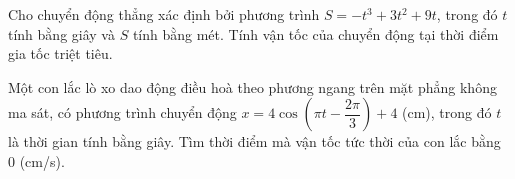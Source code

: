\begin{ex}%
	Cho chuyển động thẳng xác định bởi phương trình $S=-t^3+3 t^2+9 t$,  trong đó $t$ tính bằng giây và $S$ tính bằng mét. Tính vận tốc của chuyển động tại thời điểm gia tốc triệt tiêu.\\
\end{ex}

\begin{bt}%
	Một con lắc lò xo dao động điều hoà theo phương ngang trên mặt phẳng không ma sát, có phương trình chuyển động $x=4\cos \left(\pi t-\dfrac{2\pi}{3}\right)+4$ (cm), trong đó $t$ là thời gian tính bằng giây. Tìm thời điểm mà vận tốc tức thời của con lắc bằng $0$  (cm/s).
\end{bt}

